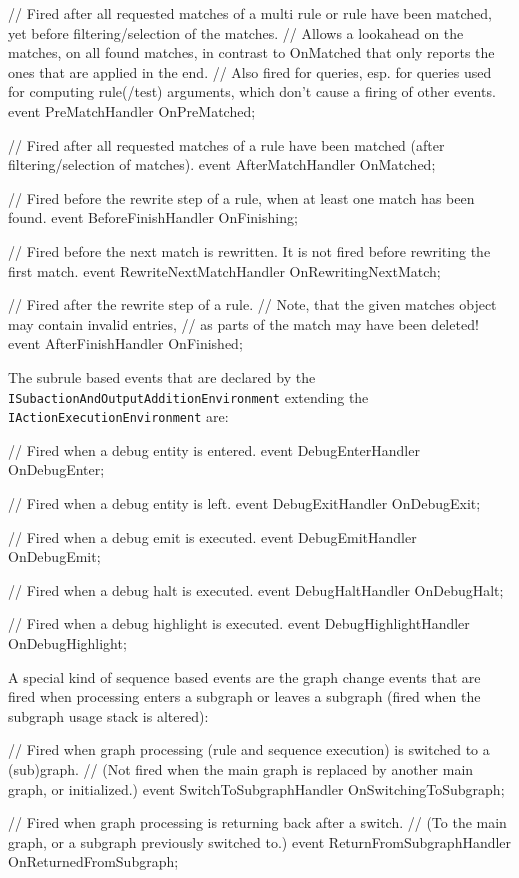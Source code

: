 \begin{csharplet}
// Fired after all requested matches of a multi rule or rule have been matched, yet before filtering/selection of the matches.
// Allows a lookahead on the matches, on all found matches, in contrast to OnMatched that only reports the ones that are applied in the end.
// Also fired for queries, esp. for queries used for computing rule(/test) arguments, which don't cause a firing of other events.
event PreMatchHandler OnPreMatched;

// Fired after all requested matches of a rule have been matched (after filtering/selection of matches).
event AfterMatchHandler OnMatched;

// Fired before the rewrite step of a rule, when at least one match has been found.
event BeforeFinishHandler OnFinishing;

// Fired before the next match is rewritten. It is not fired before rewriting the first match.
event RewriteNextMatchHandler OnRewritingNextMatch;

// Fired after the rewrite step of a rule.
// Note, that the given matches object may contain invalid entries,
// as parts of the match may have been deleted!
event AfterFinishHandler OnFinished;
\end{csharplet}

The subrule based events that are declared by the \texttt{ISubaction\-And\-Output\-Addition\-Environment} extending the \texttt{IActionExecutionEnvironment} are:

\begin{csharplet}
// Fired when a debug entity is entered.
event DebugEnterHandler OnDebugEnter;

// Fired when a debug entity is left.
event DebugExitHandler OnDebugExit;

// Fired when a debug emit is executed.
event DebugEmitHandler OnDebugEmit;

// Fired when a debug halt is executed.
event DebugHaltHandler OnDebugHalt;

// Fired when a debug highlight is executed.
event DebugHighlightHandler OnDebugHighlight;
\end{csharplet}

A special kind of sequence based events are the graph change events that are fired when processing enters a subgraph or leaves a subgraph (fired when the subgraph usage stack is altered):

\begin{csharplet}
// Fired when graph processing (rule and sequence execution) is switched to a (sub)graph.
// (Not fired when the main graph is replaced by another main graph, or initialized.)
event SwitchToSubgraphHandler OnSwitchingToSubgraph;

// Fired when graph processing is returning back after a switch.
// (To the main graph, or a subgraph previously switched to.)
event ReturnFromSubgraphHandler OnReturnedFromSubgraph;
\end{csharplet}

